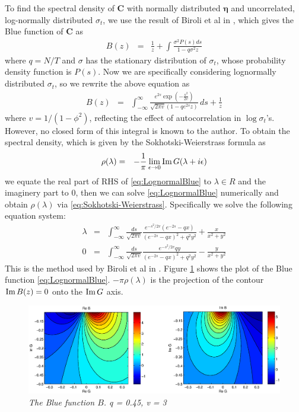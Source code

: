 \documentclass{article}
\begin{document}
To find the spectral density of $\bm C$ with normally distributed $\bm
\eta$ and uncorrelated, log-normally distributed $\sigma_t$, we use
the result of Biroli et al in \cite{biroli2007student}, which gives
the Blue function of $\bm C$ as
\begin{eqnarray*}
  B(z) &=& \frac{1}{z} + \int \frac{\sigma ^2 P(s) ds}{1-q \sigma ^2 z}
\end{eqnarray*}
where $q = N/T$ and $\sigma$ has the stationary distribution of
$\sigma_t$, whose probability density function is $P(s)$. Now we are
specifically considering lognormally distributed $\sigma_t$, so we
rewrite the above equation as
\begin{eqnarray}
B(z) &=& \int_{-\infty }^{\infty } \frac{e^{2 s} \exp \left(-\frac{s^2}{2
      v}\right)}{\sqrt{2 \pi  v} \left(1-q e^{2 s} z\right)} \,
ds+\frac{1}{z} \label{eq:LognormalBlue}
\end{eqnarray}
where $v = 1/(1 - \phi^2)$, reflecting the effect
of autocorrelation in $\log \sigma_t$'s. However, no closed form of
this integral is known to the author. To obtain the spectral density,
which is given by the Sokhotski-Weierstrass formula as
\begin{eqnarray}
  \rho(\lambda) &=& -{1 \over \pi} \lim_{\epsilon \to 0} \text{Im}\, G(\lambda +
  i\epsilon) \label{eq:Sokhotski-Weierstrass}
\end{eqnarray}
we equate the real part of RHS of \eqref{eq:LognormalBlue} to $\lambda \in
R$ and the imaginery part to 0, then we can solve \eqref{eq:LognormalBlue}
numerically and obtain $\rho(\lambda)$ via
\eqref{eq:Sokhotski-Weierstrass}. Specifically we solve the following
equation system:
\begin{eqnarray}
\lambda &=& \int_{-\infty}^{\infty} \frac{ds}{\sqrt{2\pi v}}
\frac{
  e^{-s^2/2v}(e^{-2s} - qx)
}{
  (e^{-2s} - qx)^2 + q^2 y^2  
} +
\frac{x}{x^2 + y^2} \label{eq:LognormalBlueReal}\\
0 &=& \int_{-\infty}^{\infty} \frac{ds}{\sqrt{2\pi v}}
\frac{
  e^{-s^2/2v} q y
}{
  (e^{-2s} - qx)^2 + q^2 y^2  
} -
\frac{y}{x^2 + y^2} \label{eq:LognormalBlueImag}
\end{eqnarray}
This is the method used by Biroli et al in
\cite{biroli2007student}. Figure \ref{fig:LognormalBlue}
shows the plot of the Blue function \eqref{eq:LognormalBlue}. $-\pi
\rho(\lambda)$ is the projection of the contour $\text{Im}\, B(z) = 0$ onto the $\text{Im}\,
G$ axis.
\begin{figure}[htb!]
  \centering
    \includegraphics[scale=0.45, clip=true, trim=66 0 84
    0]{../pics/LognormalBlue.eps}
  \caption{\small \it The Blue function $B$. q = 0.45, v = 3}
  \label{fig:LognormalBlue}
\end{figure}
\end{document}
